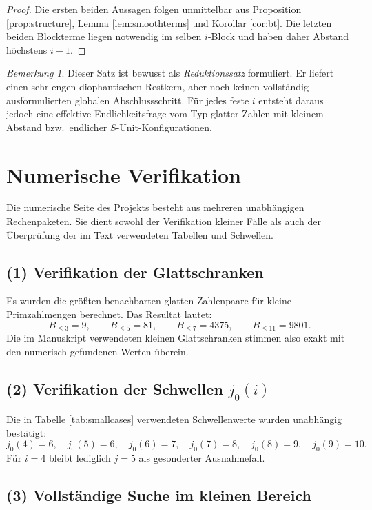 \documentclass[12pt,a4paper]{article}
\theoremstyle{plain}
\theoremstyle{definition}
\theoremstyle{remark}
\newtheorem{bemerkung}{Bemerkung}
\begin{document}
	\begin{proof}
		Die ersten beiden Aussagen folgen unmittelbar aus Proposition \ref{prop:structure}, Lemma \ref{lem:smoothterms} und Korollar \ref{cor:bt}. 
		Die letzten beiden Blockterme liegen notwendig im selben $i$-Block und haben daher Abstand höchstens $i-1$.
	\end{proof}
	
	\begin{bemerkung}
		Dieser Satz ist bewusst als \emph{Reduktionssatz} formuliert. 
		Er liefert einen sehr engen diophantischen Restkern, aber noch keinen vollständig ausformulierten globalen Abschlussschritt. 
		Für jedes feste $i$ entsteht daraus jedoch eine effektive Endlichkeitsfrage vom Typ glatter Zahlen mit kleinem Abstand bzw.\ endlicher $S$-Unit-Konfigurationen.
	\end{bemerkung}
	
	\section{Numerische Verifikation}
	
	Die numerische Seite des Projekts besteht aus mehreren unabhängigen Rechenpaketen. 
	Sie dient sowohl der Verifikation kleiner Fälle als auch der Überprüfung der im Text verwendeten Tabellen und Schwellen.
	
	\subsection*{(1) Verifikation der Glattschranken}
	
	Es wurden die größten benachbarten glatten Zahlenpaare für kleine Primzahlmengen berechnet. 
	Das Resultat lautet:
	\[
	B_{\le 3}=9,\qquad
	B_{\le 5}=81,\qquad
	B_{\le 7}=4375,\qquad
	B_{\le 11}=9801.
	\]
	Die im Manuskript verwendeten kleinen Glattschranken stimmen also exakt mit den numerisch gefundenen Werten überein.
	
	\subsection*{(2) Verifikation der Schwellen $j_0(i)$}
	
	Die in Tabelle \ref{tab:smallcases} verwendeten Schwellenwerte wurden unabhängig bestätigt:
	\[
	j_0(4)=6,\quad
	j_0(5)=6,\quad
	j_0(6)=7,\quad
	j_0(7)=8,\quad
	j_0(8)=9,\quad
	j_0(9)=10.
	\]
	Für $i=4$ bleibt lediglich $j=5$ als gesonderter Ausnahmefall.
	
	\subsection*{(3) Vollständige Suche im kleinen Bereich}
	
\end{document}
